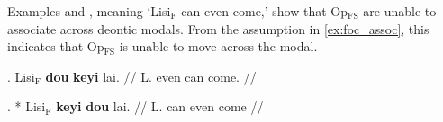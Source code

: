 \documentclass[11pt]{article}
\newcommand{\F}{\ensuremath{_{\mathrm{F}}}}
\newcommand{\opfs}{Op\(_{\mathrm{FS}}\)}
\begin{document}
Examples \Next and \NNext, meaning `Lisi\F{} can even come,' show that \opfs{} are unable to associate across deontic modals.
From the assumption in \cref{ex:foc_assoc}, this indicates that \opfs{} is unable to move across the modal.
\begin{paracol}{2}
 \ex. \label{ex:fs_root}
\begingl
  \gla Lisi\F{} \textbf{dou} \textbf{keyi} lai. //
  \glb L. even can come. //
\endgl
 
  \switchcolumn
\ex. *\begingl
\gla Lisi\F{} \textbf{keyi} \textbf{dou} lai. //
  \glb L. can even come //
\endgl

\end{paracol}




\end{document}
